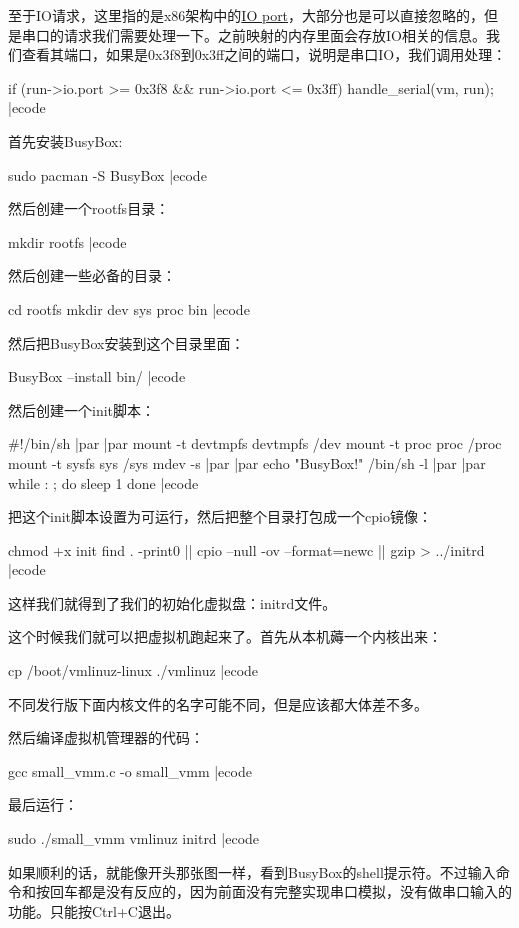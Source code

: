 至于\sp IO\sp 请求，这里指的是\sp x86\sp 架构中的\sp \href{https://wiki.osdev.org/I/O_Ports}{IO port}，大部分也是可以直接忽略的，但是串口的请求我们需要处理一下。之前映射的内存里面会存放\sp IO\sp 相关的信息。我们查看其端口，如果是\sp 0x3f8\sp 到\sp 0x3ff\sp 之间的端口，说明是串口\sp IO，我们调用\sp 处理：

\bcode
if (run->io.port >= 0x3f8 && run->io.port <= 0x3ff) {
    handle_serial(vm, run);
}
|ecode


首先安装\sp BusyBox:

\bcode
sudo pacman -S BusyBox
|ecode

然后创建一个\sp rootfs\sp 目录：

\bcode
mkdir rootfs
|ecode

然后创建一些必备的目录：

\bcode
cd rootfs
mkdir dev sys proc bin
|ecode

然后把\sp BusyBox\sp 安装到这个目录里面：

\bcode
BusyBox --install bin/
|ecode

然后创建一个\sp init\sp 脚本：

\bcode
#!/bin/sh
|par |par
mount -t devtmpfs devtmpfs /dev
mount -t proc proc /proc
mount -t sysfs sys /sys
mdev -s
|par |par
echo "BusyBox!"
/bin/sh -l
|par |par
while : ; do
    sleep 1
done
|ecode

把这个\sp init\sp 脚本设置为可运行，然后把整个目录打包成一个\sp cpio\sp 镜像：

\bcode
chmod +x init
find . -print0 || cpio --null -ov --format=newc || gzip > ../initrd
|ecode

这样我们就得到了我们的初始化虚拟盘：initrd\sp 文件。


这个时候我们就可以把虚拟机跑起来了。首先从本机薅一个内核出来：

\bcode
cp /boot/vmlinuz-linux ./vmlinuz
|ecode

不同发行版下面内核文件的名字可能不同，但是应该都大体差不多。

然后编译虚拟机管理器的代码：

\bcode
gcc small_vmm.c -o small_vmm
|ecode

最后运行：

\bcode
sudo ./small_vmm vmlinuz initrd
|ecode

如果顺利的话，就能像开头那张图一样，看到\sp BusyBox\sp 的\sp shell\sp 提示符。不过输入命令和按回车都是没有反应的，因为前面没有完整实现串口模拟，没有做串口输入的功能。只能按\sp Ctrl+C\sp 退出。

